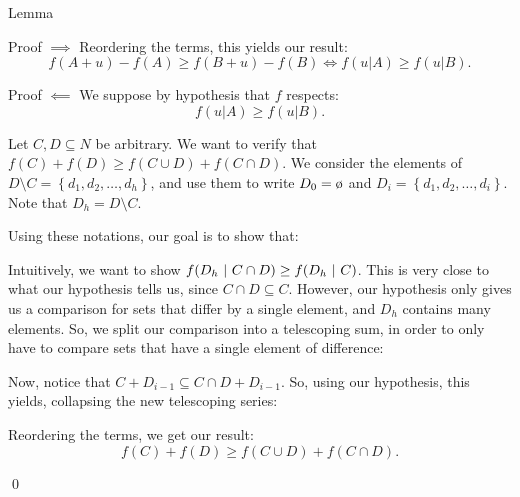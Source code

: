 \documentclass[a4paper]{article}
\begin{document}
\begin{parag}{Lemma}
\begin{subparag}{Proof $\implies$}
        Reordering the terms, this yields our result: 
        \[f\left(A + u\right) - f\left(A\right) \geq f\left(B + u\right) - f\left(B\right) \iff f\left(u | A\right) \geq f\left(u | B\right).\]
    \end{subparag}

    \begin{subparag}{Proof $\impliedby$}
        We suppose by hypothesis that $f$ respects: 
        \[f\left(u|A\right) \geq f\left(u|B\right).\]
        
        Let $C, D \subseteq N$ be arbitrary. We want to verify that $f\left(C\right) + f\left(D\right) \geq f\left(C \cup D\right) + f\left(C \cap D\right)$. We consider the elements of $D \setminus C = \left\{d_1, d_2, \ldots, d_h\right\}$, and use them to write $D_0 = \o$ and $D_i = \left\{d_1, d_2, \ldots, d_i\right\}$. Note that $D_h = D \setminus C$.

        Using these notations, our goal is to show that: 

        Intuitively, we want to show $f\left(D_h \suchthat C \cap D\right) \geq f\left(D_h \suchthat C\right)$. This is very close to what our hypothesis tells us, since $C \cap D \subseteq C$. However, our hypothesis only gives us a comparison for sets that differ by a single element, and $D_h$ contains many elements. So, we split our comparison into a telescoping sum, in order to only have to compare sets that have a single element of difference:
        
        Now, notice that $C + D_{i-1} \subseteq C \cap D + D_{i-1}$. So, using our hypothesis, this yields, collapsing the new telescoping series:
        
        Reordering the terms, we get our result: 
        \[f\left(C\right) + f\left(D\right) \geq f\left(C \cup D\right) + f\left(C \cap D\right).\]
        
        \qed
    \end{subparag}
\end{parag}
\end{document}
